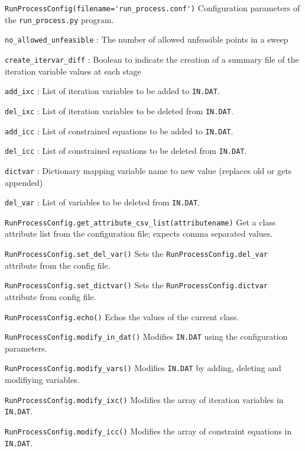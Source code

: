 \documentclass[11pt,a4paper]{report}
\newcommand{\indat}{\mbox{\texttt{IN.DAT}}}
\begin{document}
\begin{description}

\item{\verb|RunProcessConfig(filename='run_process.conf')|} Configuration
  parameters of the \verb|run_process.py| program.

  \verb|no_allowed_unfeasible| : The number of allowed unfeasible points in a
  sweep

  \verb|create_itervar_diff| : Boolean to indicate the creation of a summary
  file of the iteration variable values at each stage

  \verb|add_ixc| : List of iteration variables to be added to \indat.

  \verb|del_ixc| : List of iteration variables to be deleted from \indat.

  \verb|add_icc| : List of constrained equations to be added to \indat.

  \verb|del_icc| : List of constrained equations to be deleted from \indat.

  \verb|dictvar| : Dictionary mapping variable name to new value (replaces old
  or gets appended)

  \verb|del_var| : List of variables to be deleted from \indat.

\item{\verb|RunProcessConfig.get_attribute_csv_list(attributename)|} Get a
  class attribute list from the configuration file; expects comma separated
  values.

\item{\verb|RunProcessConfig.set_del_var()|} Sets the
  \verb|RunProcessConfig.del_var| attribute from the config file.

\item{\verb|RunProcessConfig.set_dictvar()|} Sets the
  \verb|RunProcessConfig.dictvar| attribute from config file.

\item{\verb|RunProcessConfig.echo()|} Echos the values of the current class.

\item{\verb|RunProcessConfig.modify_in_dat()|} Modifies \indat\/ using the
  configuration parameters.

\item{\verb|RunProcessConfig.modify_vars()|} Modifies \indat\/ by adding,
  deleting and modifiying variables.

\item{\verb|RunProcessConfig.modify_ixc()|} Modifies the array of iteration
  variables in \indat.

\item{\verb|RunProcessConfig.modify_icc()|} Modifies the array of constraint
  equations in \indat.

\end{description}
\end{document}
